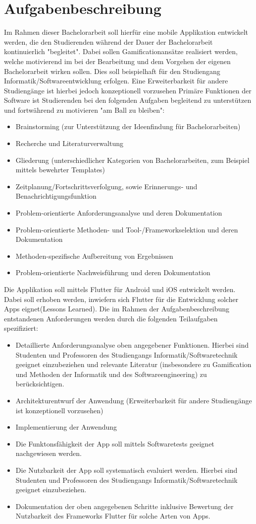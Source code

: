 \documentclass{scrreprt}
\begin{document}
\section{Aufgabenbeschreibung}
Im Rahmen dieser Bachelorarbeit soll hierfür eine mobile Applikation entwickelt werden, die den Studierenden während der Dauer der Bachelorarbeit kontinuierlich "begleitet". Dabei sollen Gamificationansätze realisiert werden, welche motivierend im bei der Bearbeitung und dem Vorgehen der eigenen Bachelorarbeit wirken sollen. Dies soll beispielhaft für den Studiengang Informatik/Softwareentwicklung erfolgen. Eine Erweiterbarkeit für andere Studiengänge ist hierbei jedoch konzeptionell vorzusehen
Primäre Funktionen der Software ist Studierenden bei den folgenden Aufgaben begleitend zu unterstützen und fortwährend zu motivieren "am Ball zu bleiben":
\begin{itemize}
\item Brainstorming (zur Unterstützung der Ideenfindung für Bachelorarbeiten)
\item Recherche und Literaturverwaltung
\item Gliederung (unterschiedlicher Kategorien von Bachelorarbeiten, zum Beispiel mittels bewehrter Templates)
\item Zeitplanung/Fortschrittsverfolgung, sowie Erinnerungs- und Benachrichtigungsfunktion 
\item Problem-orientierte Anforderungsanalyse und deren Dokumentation
\item Problem-orientierte Methoden- und Tool-/Frameworkselektion und deren Dokumentation
\item Methoden-spezifische Aufbereitung von Ergebnissen
\item Problem-orientierte Nachweisführung und deren Dokumentation
\end{itemize}
Die Applikation soll mittels Flutter für Android und iOS entwickelt werden. Dabei soll erhoben werden, inwiefern sich Flutter für die Entwicklung solcher Apps eignet(Lessons Learned).
Die im Rahmen der Aufgabenbeschreibung entstandenen Anforderungen werden durch die folgenden Teilaufgaben spezifiziert:
\begin{itemize}
\item Detaillierte Anforderungsanalyse oben angegebener Funktionen. Hierbei sind Studenten und Professoren des Studiengangs Informatik/Softwaretechnik geeignet einzubeziehen und relevante Literatur (insbesondere zu Gamification und Methoden der Informatik und des Softwareengineering) zu berücksichtigen.
\item Architekturentwurf der Anwendung (Erweiterbarkeit für andere Studiengänge ist konzeptionell vorzusehen)
\item Implementierung der Anwendung
\item Die Funktonsfähigkeit der App soll mittels Softwaretests geeignet nachgewiesen werden.
\item Die Nutzbarkeit der App soll systematisch evaluiert werden. Hierbei sind Studenten und Professoren des Studiengangs Informatik/Softwaretechnik geeignet einzubeziehen.
\item Dokumentation der oben angegebenen Schritte inklusive Bewertung der Nutzbarkeit des Frameworks Flutter für solche Arten von Apps.
\end{itemize}
\end{document}

